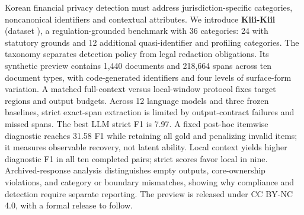 Korean financial privacy detection must address jurisdiction-specific categories, noncanonical identifiers and contextual attributes. We introduce \textbf{Kiii-Kiii} (dataset \kiii{}), a regulation-grounded benchmark with 36 categories: 24 with statutory grounds and 12 additional quasi-identifier and profiling categories. The taxonomy separates detection policy from legal redaction obligations. Its synthetic preview contains 1,440 documents and 218,664 spans across ten document types, with code-generated identifiers and four levels of surface-form variation. A matched full-context versus local-window protocol fixes target regions and output budgets. Across 12 language models and three frozen baselines, strict exact-span extraction is limited by output-contract failures and missed spans. The best LLM strict F1 is 7.97. A fixed post-hoc itemwise diagnostic reaches 31.58 F1 while retaining all gold and penalizing invalid items; it measures observable recovery, not latent ability. Local context yields higher diagnostic F1 in all ten completed pairs; strict scores favor local in nine. Archived-response analysis distinguishes empty outputs, core-ownership violations, and category or boundary mismatches, showing why compliance and detection require separate reporting. The preview is released under CC BY-NC 4.0, with a formal release to follow.

